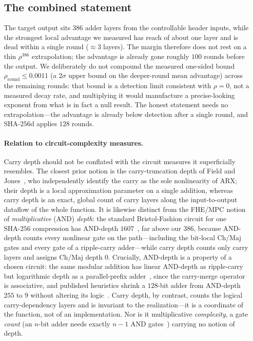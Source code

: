 \documentclass[11pt]{article}
\theoremstyle{remark}
\newcommand{\SHA}{\mathrm{SHA\text{-}256}}
\newcommand{\SHAd}{\mathrm{SHA\text{-}256d}}
\newcommand{\Ch}{\mathrm{Ch}}
\newcommand{\Maj}{\mathrm{Maj}}
\begin{document}
\subsection{The combined statement}

The target output sits $386$ adder layers from the controllable header
inputs, while the strongest local advantage we measured has reach of
about one layer and is dead within a single round ($\approx 3$ layers).
The margin therefore does not rest on a thin
$\rho^{386}$ extrapolation; the advantage is already gone roughly $100$
rounds before the output. We deliberately do not compound the measured
one-sided bound $\rho_{\text{round}}\le 0.0011$ (a $2\sigma$ upper bound
on the deeper-round mean advantage) across the remaining rounds: that
bound is a detection limit consistent with $\rho=0$, not a measured decay
rate, and multiplying it would manufacture a precise-looking exponent from
what is in fact a null result. The honest statement needs no
extrapolation---the advantage is already below detection after a single
round, and $\SHAd$ applies $128$ rounds.

\paragraph{Relation to circuit-complexity measures.}
Carry depth should not be conflated with the circuit measures it
superficially resembles. The closest prior notion is the carry-truncation
depth of Field and Jones~\cite{fieldjones}, who independently identify the
carry as the sole nonlinearity of ARX; their depth is a local
approximation parameter on a single addition, whereas carry depth is an
exact, global count of carry layers along the input-to-output dataflow of
the whole function. It is likewise distinct from the FHE/MPC notion of
\emph{multiplicative} (AND) \emph{depth}: the standard Bristol-Fashion
circuit for one $\SHA$ compression has AND-depth $1607$~\cite{bristol,multdepth},
far above our $386$, because AND-depth counts every nonlinear gate on the
path---including the bit-local $\Ch$/$\Maj$ gates and every gate of a
ripple-carry adder---while carry depth counts only carry layers and
assigns $\Ch$/$\Maj$ depth $0$. Crucially, AND-depth is a property of a
chosen circuit: the same modular addition has linear AND-depth as
ripple-carry but logarithmic depth as a parallel-prefix
adder~\cite{cla}, since the carry-merge operator is associative, and
published heuristics shrink a $128$-bit adder from AND-depth $255$ to $9$
without altering its logic~\cite{multdepth}. Carry depth, by contrast,
counts the logical carry-dependency layers and is invariant to the
realization---it is a coordinate of the function, not of an
implementation. Nor is it multiplicative \emph{complexity}, a gate
\emph{count} (an $n$-bit adder needs exactly $n{-}1$ AND
gates~\cite{boyarperalta}) carrying no notion of depth.
\end{document}
